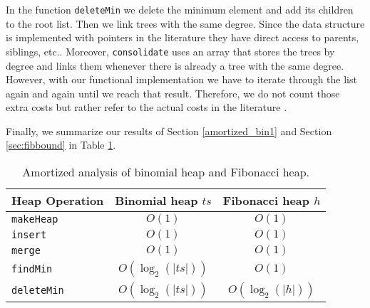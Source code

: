 \documentclass{clmthesis}
\begin{document}
In the function \texttt{deleteMin} we delete the minimum element and add its children to the root list. Then we link trees with the same degree. Since the data structure is implemented with pointers in the literature they have direct access to parents, siblings, etc.. Moreover, \texttt{consolidate} uses an array that stores the trees by degree and links them whenever there is already a tree with the same degree. However, with our functional implementation we have to iterate through the list again and again until we reach that result. Therefore, we do not count those extra costs but rather refer to the actual costs in the literature \cite{thomas2022}.


Finally, we summarize our results of Section \ref{amortized_bin1} and Section \ref{sec:fibbound} in Table \ref{tab:amortized_cost}.
\begin{table}[h]
	\centering
	\caption{Amortized analysis of binomial heap and Fibonacci heap.}
	\begin{tabular}{lcc}
		Heap Operation & Binomial heap $ts$ & Fibonacci heap $h$ \\
		\hline
		\texttt{makeHeap} & $O(1)$ & $O(1)$ \\
		\texttt{insert} & $O(1)$  & $O(1)$ \\
		\texttt{merge} & $O(1)$ & $O(1)$ \\
		\texttt{findMin} & $O(\log_2(|ts|))$  & $O(1)$ \\
		\texttt{deleteMin} & $O(\log_2(|ts|))$ & $O(\log_2(|h|))$ \\
		\hline
	\end{tabular}
	 \label{tab:amortized_cost}
	\end{table}
\end{document}
